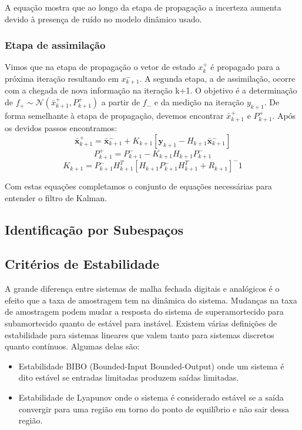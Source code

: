 A equação mostra que ao longo da etapa de propagação a incerteza aumenta devido à presença de ruído no modelo dinâmico usado.

\subsubsection{Etapa de assimilação}
Vimos que na etapa de propagação o vetor de estado $x^+_k$ é propagado para a próxima iteração resultando em $x^-_{k+1}$. A segunda etapa, a de assimilação, ocorre com a chegada de nova informação na iteração k+1. O objetivo é a determinação de $f_+ \sim \mathcal{N} (\bar{x}^+_{k+1},P^+_{k+1})$ a partir de $f_-$ e da medição na iteração $y_{k+1}$. De forma semelhante à etapa de propagação, devemos encontrar $\bar{x}^+_{k+1}$ e $P^+_{k+1}$. Após os devidos passos encontramos:
\begin{equation}
\bar{\mathbf{x}}^+_{k+1}=\bar{\mathbf{x}}^-_{k+1}+K_{k+1}[\mathbf{y}_{k+1}-H_{k+1} \bar{\mathbf{x}} ^-_{k+1}]
\end{equation}
\begin{equation}
P^+_{k+1}=P^-_{k+1}-K_{k+1} H_{k+1} P^-_{k+1}
\end{equation}
\begin{equation}
K_{k+1}=P^-_{k+1} H^T_{k+1}[H_{k+1} P^-_{k+1} H^T_{k+1}+R_{k+1}]^-1
\end{equation}

Com estas equações completamos o conjunto de equações necessárias para entender o filtro de Kalman.
\subsection {Identificação por Subespaços}

\subsection{Critérios de Estabilidade}
A grande diferença entre sistemas de malha fechada digitais e analógicos é o efeito que a taxa de amostragem tem na dinâmica do sistema. Mudanças na taxa de amostragem podem mudar a resposta do sistema de superamortecido para subamortecido quanto de estável para instável.
\newline
Existem várias definições de estabilidade para sistemas lineares que valem tanto para sistemas discretos quanto contínuos. Algumas delas são:
\begin{itemize}
	\item Estabilidade BIBO (Bounded-Input Bounded-Output) onde um sistema é dito estável se entradas limitadas produzem saídas limitadas.
	\item Estabilidade de Lyapunov onde o sistema é considerado estável se a saída convergir para uma região em torno do ponto de equilíbrio e não sair dessa região.
\end{itemize}


